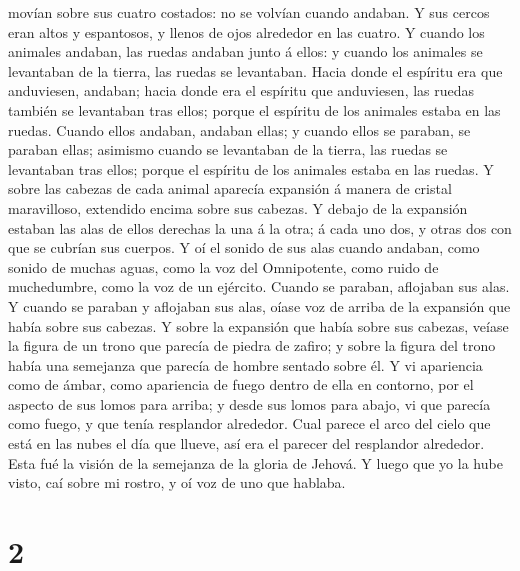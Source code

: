 movían sobre sus cuatro costados: no se volvían cuando andaban.
 Y sus cercos eran altos y espantosos, y llenos de ojos
alrededor en las cuatro.  Y cuando los animales andaban,
las ruedas andaban junto á ellos: y cuando los animales se levantaban de
la tierra, las ruedas se levantaban.  Hacia donde el
espíritu era que anduviesen, andaban; hacia donde era el espíritu que
anduviesen, las ruedas también se levantaban tras ellos; porque el
espíritu de los animales estaba en las ruedas.  Cuando
ellos andaban, andaban ellas; y cuando ellos se paraban, se paraban
ellas; asimismo cuando se levantaban de la tierra, las ruedas se
levantaban tras ellos; porque el espíritu de los animales estaba en las
ruedas.  Y sobre las cabezas de cada animal aparecía
expansión á manera de cristal maravilloso, extendido encima sobre sus
cabezas.  Y debajo de la expansión estaban las alas de
ellos derechas la una á la otra; á cada uno dos, y otras dos con que se
cubrían sus cuerpos.  Y oí el sonido de sus alas cuando
andaban, como sonido de muchas aguas, como la voz del Omnipotente, como
ruido de muchedumbre, como la voz de un ejército. Cuando se paraban,
aflojaban sus alas.  Y cuando se paraban y aflojaban sus
alas, oíase voz de arriba de la expansión que había sobre sus cabezas.
 Y sobre la expansión que había sobre sus cabezas, veíase
la figura de un trono que parecía de piedra de zafiro; y sobre la figura
del trono había una semejanza que parecía de hombre sentado sobre él.
 Y vi apariencia como de ámbar, como apariencia de fuego
dentro de ella en contorno, por el aspecto de sus lomos para arriba; y
desde sus lomos para abajo, vi que parecía como fuego, y que tenía
resplandor alrededor.  Cual parece el arco del cielo que
está en las nubes el día que llueve, así era el parecer del resplandor
alrededor. Esta fué la visión de la semejanza de la gloria de Jehová. Y
luego que yo la hube visto, caí sobre mi rostro, y oí voz de uno que
hablaba.

\hypertarget{section-1}{%
\section{2}\label{section-1}}

